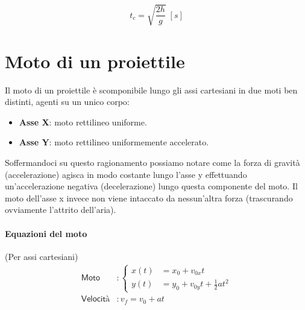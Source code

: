             \begin{equation}
                t_c=\sqrt{\frac{2h}{g}} \; [s]
            \end{equation}

    \section{Moto di un proiettile} 

        Il moto di un proiettile è scomponibile lungo gli assi cartesiani in 
        due moti ben distinti, agenti su un unico corpo:
        \begin{itemize}
            \item \textbf{Asse X}: moto rettilineo uniforme.
            \item \textbf{Asse Y}: moto rettilineo uniformemente accelerato.
        \end{itemize}
        Soffermandoci su questo ragionamento possiamo notare come la forza di 
        gravità (accelerazione) agisca in modo costante lungo l'asse y 
        effettuando un'accelerazione negativa (decelerazione) lungo questa 
        componente del moto. Il moto dell'asse x invece non viene intaccato da 
        nessun'altra forza (trascurando ovviamente l'attrito dell'aria).
        
        \paragraph{Equazioni del moto}
        (Per assi cartesiani)
        \begin{align}
            \textsf{Moto} &: \begin{cases}
                    x(t) &= x_0 + v_{0x}t \\
                    y(t) &= y_0 + v_{0y}t + \frac{1}{2}at^2
                \end{cases} \\
                \textsf{Velocità} &: v_{f} = v_{0} + at
        \end{align}

